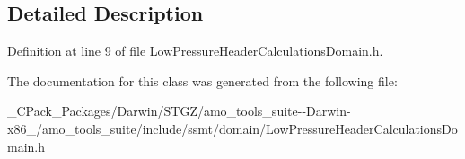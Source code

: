 \subsection{Detailed Description}


Definition at line 9 of file Low\+Pressure\+Header\+Calculations\+Domain.\+h.



The documentation for this class was generated from the following file\+:\begin{DoxyCompactItemize}
\item 
\+\_\+\+C\+Pack\+\_\+\+Packages/\+Darwin/\+S\+T\+G\+Z/amo\+\_\+tools\+\_\+suite-\/-\/\+Darwin-\/x86\+\_/amo\+\_\+tools\+\_\+suite/include/ssmt/domain/Low\+Pressure\+Header\+Calculations\+Domain.\+h\end{DoxyCompactItemize}
